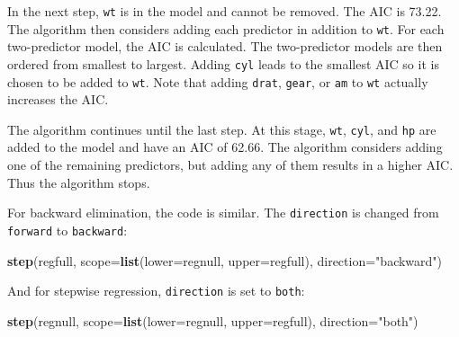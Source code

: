 \documentclass[
]{book}
\newenvironment{Shaded}{\begin{snugshade}}{\end{snugshade}}
\newcommand{\AttributeTok}[1]{\textcolor[rgb]{0.13,0.29,0.53}{#1}}
\newcommand{\FunctionTok}[1]{\textcolor[rgb]{0.13,0.29,0.53}{\textbf{#1}}}
\newcommand{\NormalTok}[1]{#1}
\newcommand{\StringTok}[1]{\textcolor[rgb]{0.31,0.60,0.02}{#1}}
\begin{document}
In the next step, \texttt{wt} is in the model and cannot be removed. The AIC is 73.22. The algorithm then considers adding each predictor in addition to \texttt{wt}. For each two-predictor model, the AIC is calculated. The two-predictor models are then ordered from smallest to largest. Adding \texttt{cyl} leads to the smallest AIC so it is chosen to be added to \texttt{wt}. Note that adding \texttt{drat}, \texttt{gear}, or \texttt{am} to \texttt{wt} actually increases the AIC.

The algorithm continues until the last step. At this stage, \texttt{wt}, \texttt{cyl}, and \texttt{hp} are added to the model and have an AIC of 62.66. The algorithm considers adding one of the remaining predictors, but adding any of them results in a higher AIC. Thus the algorithm stops.

For backward elimination, the code is similar. The \texttt{direction} is changed from \texttt{forward} to \texttt{backward}:

\begin{Shaded}
\begin{Highlighting}[]
\FunctionTok{step}\NormalTok{(regfull, }\AttributeTok{scope=}\FunctionTok{list}\NormalTok{(}\AttributeTok{lower=}\NormalTok{regnull, }\AttributeTok{upper=}\NormalTok{regfull), }\AttributeTok{direction=}\StringTok{"backward"}\NormalTok{)}
\end{Highlighting}
\end{Shaded}

And for stepwise regression, \texttt{direction} is set to \texttt{both}:

\begin{Shaded}
\begin{Highlighting}[]
\FunctionTok{step}\NormalTok{(regnull, }\AttributeTok{scope=}\FunctionTok{list}\NormalTok{(}\AttributeTok{lower=}\NormalTok{regnull, }\AttributeTok{upper=}\NormalTok{regfull), }\AttributeTok{direction=}\StringTok{"both"}\NormalTok{)}
\end{Highlighting}
\end{Shaded}
\end{document}
